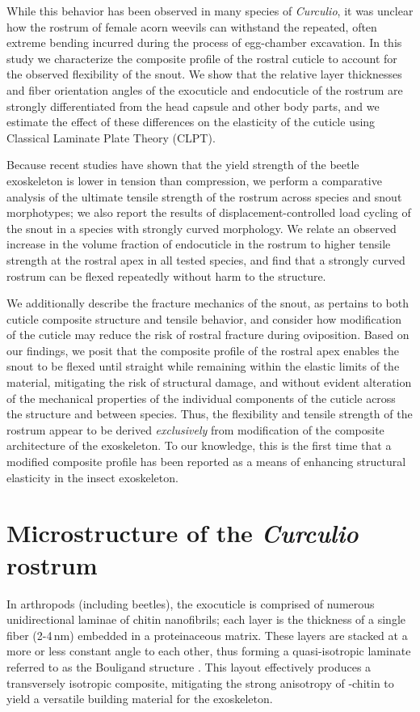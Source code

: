 \documentclass[twocolumn, linenumbers, superscriptaddress, nofootinbib]{revtex4-1}
\begin{document}
{	While this behavior has been observed in many species of \textit{Curculio}, it was unclear how the rostrum of female acorn weevils can withstand the repeated, often extreme bending incurred during the process of egg-chamber excavation.
	In this study we characterize the composite profile of the rostral cuticle to account for the observed flexibility of the snout.
	We show that the relative layer thicknesses and fiber orientation angles of the exocuticle and endocuticle of the rostrum are strongly differentiated from the head capsule and other body parts, and we estimate the effect of these differences on the elasticity of the cuticle using Classical Laminate Plate Theory (CLPT).
	
	Because recent studies have shown that the yield strength of the beetle exoskeleton is lower in tension than compression, we perform a comparative analysis of the ultimate tensile strength of the rostrum across species and snout morphotypes; we also report the results of displacement-controlled load cycling of the snout in a species with strongly curved morphology.
	We relate an observed increase in the volume fraction of endocuticle in the rostrum to higher tensile strength at the rostral apex in all tested species, and find that a strongly curved rostrum can be flexed repeatedly without harm to the structure.
	
	We additionally describe the fracture mechanics of the snout, as pertains to both cuticle composite structure and tensile behavior, and consider how modification of the cuticle may reduce the risk of rostral fracture during oviposition.
	Based on our findings, we posit that the composite profile of the rostral apex enables the snout to be flexed until straight while remaining within the elastic limits of the material, mitigating the risk of structural damage, and without evident alteration of the mechanical properties of the individual components of the cuticle across the structure and between species.
	Thus, the flexibility and tensile strength of the rostrum appear to be derived \emph{exclusively} from modification of the composite architecture of the exoskeleton.
	To our knowledge, this is the first time that a modified composite profile has been reported as a means of enhancing structural elasticity in the insect exoskeleton.
}	
	\section{Microstructure of the \textit{Curculio} rostrum}
		In arthropods (including beetles), the exocuticle is comprised of numerous unidirectional laminae of chitin nanofibrils; each layer is the thickness of a single fiber (2-4\,nm) embedded in a proteinaceous matrix.
		These layers are stacked at a more or less constant angle to each other, thus forming a quasi-isotropic laminate referred to as the Bouligand structure \cite{Blackwell1980,Bouligand1972,Neville1976}. 
		This layout effectively produces a transversely isotropic composite, mitigating the strong anisotropy of \textalpha-chitin to yield a versatile building material for the exoskeleton.
		
\end{document}
